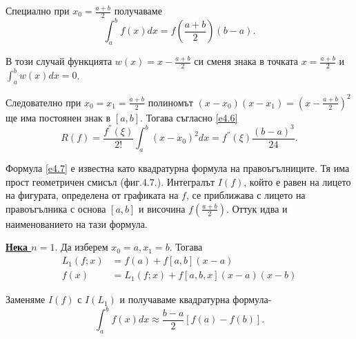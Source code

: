 \documentclass[12pt]{article}
\numberwithin{equation}{section}
\numberwithin{theorem}{section}
\numberwithin{definition}{section}
\numberwithin{corollary}{section}
\begin{document}
Специално при $x_0=\frac{a+b}{2}$ получаваме
\begin{equation}\label{e4.7}
\int_a^bf(x)dx = f\left(\frac{a+b}{2}\right)(b-a).
\end{equation}
\par
В този случай функцията $w(x)=x-\frac{a+b}{2}$ си сменя знака в точката $x=\frac{a+b}{2}$ и $\int_a^bw(x)dx=0$.
\par
Следователно при $x_0=x_1=\frac{a+b}{2}$ полиномът $(x-x_0)(x-x_1) = (x-\frac{a+b}{2})^2$ ще има постоянен знак в $[a,b]$. Тогава съгласно \ref{e4.6}
\begin{equation}\label{e4.8}
R(f) = \frac{f^{''}(\xi)}{2!}\int_a^b(x-x_0)^2dx=f^{''}(\xi)\frac{(b-a)^3}{24}.
\end{equation}
\begin{center}
\end{center}
\par
Формула \ref{e4.7} е известна като квадратурна формула на правоъгълниците. Тя има прост геометричен смисъл (фиг.4.7.). Интегралът $I(f)$, който е равен на лицето на фигурата, определена от графиката на $f$, се приближава с лицето на правоъгълника с основа $[a,b]$ и височина $f\left(\frac{a+b}{2}\right)$. Оттук идва и наименованието на тази формула.
\par
\textbf{\underline{Нека $n=1$}}. Да изберем $x_0=a,x_1=b$. Тогава
\begin{align*}
L_1(f;x)&=f(a)+f[a,b](x-a)\\
f(x)&=L_1(f;x)+f[a,b,x](x-a)(x-b)
\end{align*}
\par
Заменяме $I(f)$ с $I(L_1)$ и получаваме квадратурна формула-
\begin{equation}\label{e4.9}
\int_a^bf(x)dx\approx\frac{b-a}{2}[f(a)-f(b)].
\end{equation}
\par
\end{document}
